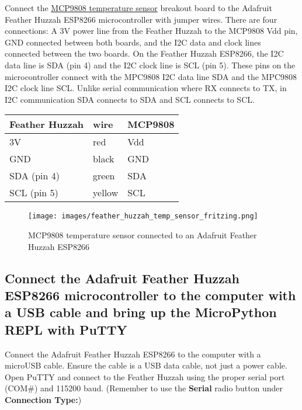 \documentclass{book}
\makeatletter
\def\maxwidth{\ifdim\Gin@nat@width>\linewidth\linewidth
\else\Gin@nat@width\fi}
\let\Oldincludegraphics\includegraphics
\renewcommand{\includegraphics}[1]{\Oldincludegraphics[width=.8\maxwidth]{#1}}
\makeatother
\begin{document}
    
        Connect the \href{https://www.adafruit.com/product/1782}{MCP9808
temperature sensor} breakout board to the Adafruit Feather Huzzah
ESP8266 microcontroller with jumper wires. There are four connections: A
3V power line from the Feather Huzzah to the MCP9808 Vdd pin, GND
connected between both boards, and the I2C data and clock lines
connected between the two boards. On the Feather Huzzah ESP8266, the I2C
data line is SDA (pin 4) and the I2C clock line is SCL (pin 5). These
pins on the microcontroller connect with the MPC9808 I2C data line SDA
and the MPC9808 I2C clock line SCL. Unlike serial communication where RX
connects to TX, in I2C communication SDA connects to SDA and SCL
connects to SCL.

\begin{longtable}[]{@{}lll@{}}
\toprule
Feather Huzzah & wire & MCP9808\tabularnewline
\midrule
\endhead
3V & red & Vdd\tabularnewline
GND & black & GND\tabularnewline
SDA (pin 4) & green & SDA\tabularnewline
SCL (pin 5) & yellow & SCL\tabularnewline
\bottomrule
\end{longtable}

\begin{figure}
\centering
\texttt{[image: images/feather\_huzzah\_temp\_sensor\_fritzing.png]}
\caption{MCP9808 temperature sensor connected to an Adafruit Feather
Huzzah ESP8266}
\end{figure}
    




    
        \hypertarget{connect-the-adafruit-feather-huzzah-esp8266-microcontroller-to-the-computer-with-a-usb-cable-and-bring-up-the-micropython-repl-with-putty}{%
\subsection{Connect the Adafruit Feather Huzzah ESP8266 microcontroller
to the computer with a USB cable and bring up the MicroPython REPL with
PuTTY}\label{connect-the-adafruit-feather-huzzah-esp8266-microcontroller-to-the-computer-with-a-usb-cable-and-bring-up-the-micropython-repl-with-putty}}
    




    
        Connect the Adafruit Feather Huzzah ESP8266 to the computer with a
microUSB cable. Ensure the cable is a USB data cable, not just a power
cable. Open PuTTY and connect to the Feather Huzzah using the proper
serial port (COM\#) and 115200 baud. (Remember to use the
\textbf{Serial} radio button under \textbf{Connection Type:})
\end{document}
